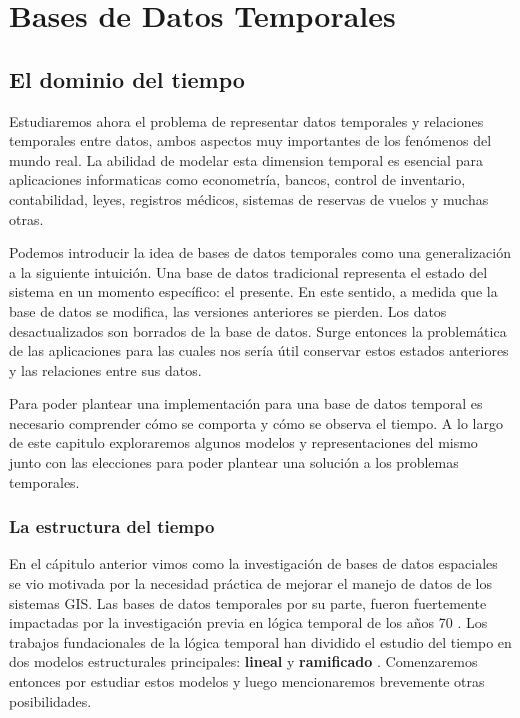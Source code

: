 \chapter{Bases de Datos Temporales}  \label{cap:t}

\section{El dominio del tiempo}

Estudiaremos ahora el problema de representar datos temporales y relaciones temporales entre datos,
ambos aspectos muy importantes de los fenómenos del mundo real.
La abilidad de modelar esta dimension temporal es esencial para aplicaciones informaticas como
econometría, bancos, control de inventario, contabilidad, leyes, registros médicos, sistemas de reservas de vuelos y muchas otras.

Podemos introducir la idea de bases de datos temporales como una generalización a la siguiente intuición.
Una base de datos tradicional representa el estado del sistema en un momento específico: el presente.
En este sentido, a medida que la base de datos se modifica, las versiones anteriores se pierden.
Los datos desactualizados son borrados de la base de datos.
Surge entonces la problemática de las aplicaciones para las cuales nos sería útil conservar estos estados anteriores
y las relaciones entre sus datos.

Para poder plantear una implementación para una base de datos temporal es necesario comprender cómo se comporta y cómo se observa el tiempo.
A lo largo de este capitulo exploraremos algunos modelos y representaciones del mismo junto con
las elecciones para poder plantear una solución a los problemas temporales.

\subsection{La estructura del tiempo}

En el cápitulo anterior vimos como la investigación de bases de datos espaciales se vio motivada por
la necesidad práctica de mejorar el manejo de datos de los sistemas GIS.
Las bases de datos temporales por su parte, fueron fuertemente impactadas por
la investigación previa en lógica temporal de los años 70 \cite{temporal:status:directions}.
Los trabajos fundacionales de la lógica temporal han dividido el estudio del tiempo en dos modelos estructurales principales:
\textbf{lineal} y \textbf{ramificado} \cite{temporal:snodgrass}.
Comenzaremos entonces por estudiar estos modelos y luego mencionaremos brevemente otras posibilidades.

